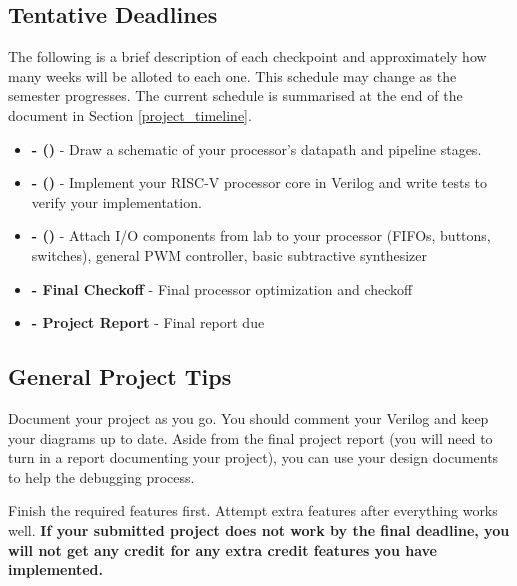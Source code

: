 \documentclass[11pt]{article}
\begin{document}
\subsection{Tentative Deadlines}
\label{tentative_deadlines}
The following is a brief description of each checkpoint and approximately how many weeks will be alloted to each one. This schedule may change as the semester progresses. The current schedule is summarised at the end of the document in Section \ref{project_timeline}.

\begin{itemize}
  \item \textbf{\blockDiagramDueDate \space - \blockDiagramTaskName \space (\blockDiagramTimeAlloted)} - Draw a schematic of your processor's datapath and pipeline stages.
  \item \textbf{\baseCPUDueDate \space - \baseCPUTaskName \space (\baseCPUTimeAlloted)} - Implement your RISC-V processor core in Verilog and write tests to verify your implementation.
  \item \textbf{\audioDueDate \space - \audioTaskName \space (\audioTimeAlloted)} - Attach I/O components from lab to your processor (FIFOs, buttons, switches), general PWM controller, basic subtractive synthesizer
  \item \textbf{\finalCheckoffDueDate \space - Final Checkoff} - Final processor optimization and checkoff
  \item \textbf{\finalReportDueDate \space - Project Report} - Final report due
\end{itemize}

\subsection{General Project Tips}
\label{tips}
Document your project as you go.
You should comment your Verilog and keep your diagrams up to date.
Aside from the final project report (you will need to turn in a report documenting your project), you can use your design documents to help the debugging process.

Finish the required features first.
Attempt extra features after everything works well.
\textbf{If your submitted project does not work by the final deadline, you will not get any credit for any extra credit features you have implemented.}
\end{document}
